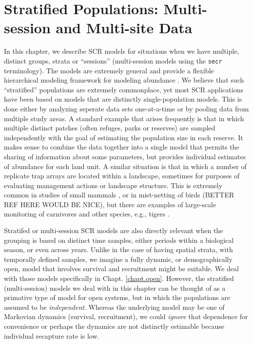 \chapter{Stratified Populations: 
Multi-session and Multi-site Data}
\label{chapt.hscr}

\vspace{0.3cm}


In this chapter, we describe SCR models for situations when we have
multiple, distinct groups, strata or ``sessions'' (multi-session
models using the \mbox{\tt secr} terminology). The models are
extremely general and provide a flexible hierarchical modeling
framework for modeling abundance \citep{converse_royle:2012,
  royle_etal:2012arXiv}.  We believe that such ``stratified''
populations are extremely commonplace, yet most SCR applications have
been based on models that are distinctly single-population
models. This is done either by analyzing seperate data sets
one-at-a-time or by pooling data from multiple study areas.  A
standard example that arises frequently is that in which multiple
distinct patches (often refuges, parks or reserves) are sampled
independently with the goal of estimating the population size in each
reserve. It makes sense to combine the data together into a single
model that permits the sharing of information about some parameters,
but provides individual estimates of abundance for each land unit.  A
similar situation is that in which a number of replicate trap arrays
are located within a landscape, sometimes for purposes of evaluating
management actions or landscape structure. This is extremely common in
studies of small mammals \citep{converse_etal:2006jwm,
  converse_etal:2006ea, converse_royle:2012}, or in mist-netting of
birds \citep{desante_etal:1995} (BETTER REF HERE WOULD BE NICE), but
there are examples of large-scale monitoring of carnivores and other
species, e.g., tigers \citep{jhala_etal:2011}.


Stratifed or multi-session SCR models are also directly relevant when
the grouping is based on distinct time samples, either periods within
a biological season, or even across years. 
Unlike in the case of having spatial strata, with temporally defined
samples, we imagine a fully dynamic, or demographically open, model
that involves survival and recruitment might be suitable. We deal with
those models specifically in Chapt. \ref{chapt.open}.  However, the
stratified (multi-session) models we deal with in this chapter can be
thought of as a primative type of model for open systems, but in which
the populations are assumed to be {\it independent}. Whereas the
underlying model may be one of Markovian dynamics (survival,
recruitment), we could {\it ignore} that dependence for convenience or
perhaps the dynamics are not distinctly estimable because individual
recapture rate is low.


